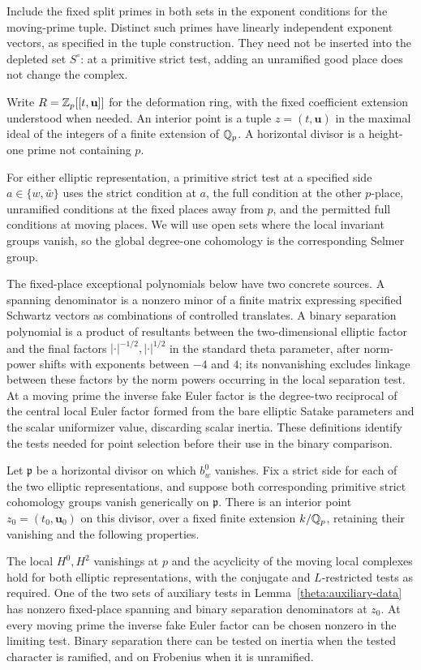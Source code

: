 Include the fixed split primes in both sets in the exponent conditions
for the moving-prime tuple.  Distinct such primes have linearly
independent exponent vectors, as specified in the tuple construction.
They need not be inserted into the depleted set $S^\circ$: at a
primitive strict test, adding an unramified good place does not change
the complex.

Write $R=\mathbb Z_p[[t,\mathbf u]]$ for the deformation ring, with the fixed
coefficient extension understood when needed.  An interior point is
a tuple $z=(t,\mathbf u)$ in the maximal ideal of the integers of a
finite extension of $\mathbb Q_p$.  A horizontal divisor is a height-one
prime not containing $p$.

For either elliptic representation, a primitive strict test at a
specified side $a\in\{w,\bar w\}$ uses the strict condition at
$a$, the full condition at the other $p$-place, unramified
conditions at the fixed places away from $p$, and the permitted
full conditions at moving places.  We will use open sets where
the local invariant groups vanish, so the global degree-one
cohomology is the corresponding Selmer group.

The fixed-place exceptional polynomials below have two concrete
sources.  A spanning denominator is a nonzero minor of a finite
matrix expressing specified Schwartz vectors as combinations of
controlled translates.  A binary separation polynomial is a
product of resultants between the two-dimensional elliptic factor
and the final factors $|\cdot|^{-1/2},|\cdot|^{1/2}$ in the standard
theta parameter, after norm-power shifts with exponents between
$-4$ and $4$; its nonvanishing excludes linkage between these
factors by the norm powers occurring in the local separation test.
At a moving
prime the inverse fake Euler factor is the degree-two reciprocal
of the central local Euler factor formed from the bare elliptic
Satake parameters and the scalar uniformizer value, discarding
scalar inertia.  These definitions identify the tests needed for
point selection before their use in the binary comparison.

\begin{lemma}\label{theta:test-point}
Let $\mathfrak p$ be a horizontal divisor on which $b_w^0$ vanishes.
Fix a strict side for each of the two elliptic representations, and
suppose both corresponding primitive strict cohomology groups
vanish generically on $\mathfrak p$.  There is an interior point
$z_0=(t_0,\mathbf u_0)$ on this divisor, over a fixed finite extension
$k/\mathbb Q_p$, retaining their vanishing and the following properties.

The local $H^0,H^2$ vanishings at $p$ and the acyclicity of the moving
local complexes hold for both elliptic representations, with the
conjugate and $L$-restricted tests as required.  One of the two sets
of auxiliary tests in Lemma~\ref{theta:auxiliary-data} has nonzero
fixed-place spanning and binary separation denominators at $z_0$.
At every moving prime the inverse fake Euler factor can be chosen
nonzero in the limiting test.  Binary separation there can be tested
on inertia when the tested character is ramified, and on Frobenius
when it is unramified.
\end{lemma}

